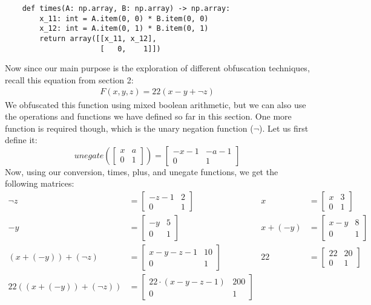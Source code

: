 \begin{verbatim}
    def times(A: np.array, B: np.array) -> np.array:
        x_11: int = A.item(0, 0) * B.item(0, 0)
        x_12: int = A.item(0, 1) * B.item(0, 1)
        return array([[x_11, x_12],
                      [   0,    1]])
\end{verbatim}
Now since our main purpose is the exploration of different obfuscation
techniques, recall this equation from section 2:
\begin{align*}
    F(x, y, z) = 22(x - y + \neg z)
\end{align*}
We obfuscated this function using mixed boolean arithmetic, but we can also use
the operations and functions we have defined so far in this section. One more
function is required though, which is the unary negation function ($ \neg $).
Let us first define it:
\begin{equation*}
    unegate\left(
    \begin{bmatrix}
        x & a \\
        0 & 1
    \end{bmatrix}
    \right)
    =
    \begin{bmatrix}
        -x - 1 & -a - 1  \\
        0      & 1
    \end{bmatrix}
\end{equation*}
Now, using our conversion, times, plus, and unegate functions, we get the
following matrices:
\begin{align*}
    \neg z &=
    \begin{bmatrix}
        -z - 1 & 2 \\
        0      & 1
    \end{bmatrix}
    &x &=
    \begin{bmatrix}
        x  &  3 \\
        0  &  1
    \end{bmatrix} \\
    -y & =
    \begin{bmatrix}
        -y & 5\\
        0  & 1
    \end{bmatrix} &
    x + (-y) &=
    \begin{bmatrix}
        x - y & 8 \\
        0      & 1
    \end{bmatrix} \\
     (x + (- y)) + (\neg z) &=
     \begin{bmatrix}
         x - y -z - 1 & 10 \\
         0            & 1
     \end{bmatrix} &
     22 &=
     \begin{bmatrix}
         22 & 20 \\
         0  & 1
     \end{bmatrix} \\
     22((x + (- y)) + (\neg z)) &=
     \begin{bmatrix}
         22 \cdot (x - y -z - 1) & 200 \\
         0 & 1
     \end{bmatrix}
\end{align*}
